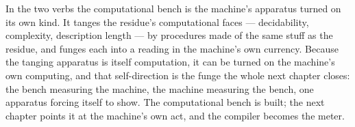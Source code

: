 In the two verbs the computational bench is the machine's apparatus turned on its own kind. It tanges the residue's
computational faces --- decidability, complexity, description length --- by procedures made of the same stuff as the
residue, and funges each into a reading in the machine's own currency. Because the tanging apparatus is itself
computation, it can be turned on the machine's own computing, and that self-direction is the funge the whole next chapter
closes: the bench measuring the machine, the machine measuring the bench, one apparatus forcing itself to show. The
computational bench is built; the next chapter points it at the machine's own act, and the compiler becomes the meter.
